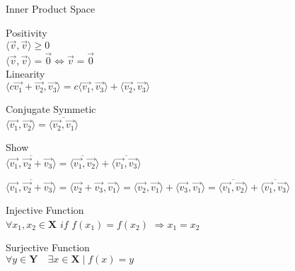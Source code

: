 \documentclass[10pt]{article}
\begin{document}
Inner Product Space

Positivity \\
$\langle\vec{v}, \vec{v}\rangle \geq 0$\\
$\langle \vec{v} , \vec{v} \rangle = \vec{0} \iff \vec{v} = \vec{0}$\\

Linearity \\
$\langle c\vec{v_1} + \vec{v_2}, \vec{v_3}\rangle = c\langle \vec{v_1}, \vec{v_3}\rangle + \langle\vec{v_2}, \vec{v_3} \rangle $

Conjugate Symmetic \\
$\langle \vec{v_1}, \vec{v_2} \rangle = \overline{\langle \vec{v_2}, \vec{v_1} \rangle}$


Show\\
$\overline{\langle \vec{v_1} , \vec{v_2} + \vec{v_3} \rangle} = \overline{ \langle \vec{v_1} , \vec{v_2}} \rangle + \overline{ \langle \vec{v_1} , \vec{v_3} \rangle }$

$ \overline{\langle \vec{v_1} , \vec{v_2} + \vec{v_3} \rangle} = \langle \vec{v_2} + \vec{v_3} , \vec{v_1} \rangle = \langle \vec{v_2}, \vec{v_1} \rangle + \langle \vec{v_3}, \vec{v_1} \rangle = \overline{\langle \vec{v_1}, \vec{v_2} \rangle} + \overline{\langle \vec{v_1}, \vec{v_3} \rangle} $


Injective Function\\
$ \forall x_1, x_2 \in \mathbf{X}  \textit{ if } f(x_1) = f(x_2) $
$ \Rightarrow x_1 = x_2 $

Surjective Function\\
$ \forall y \in \mathbf{Y}\quad \exists x \in \mathbf{X} \mid f(x) = y  $
\end{document}
